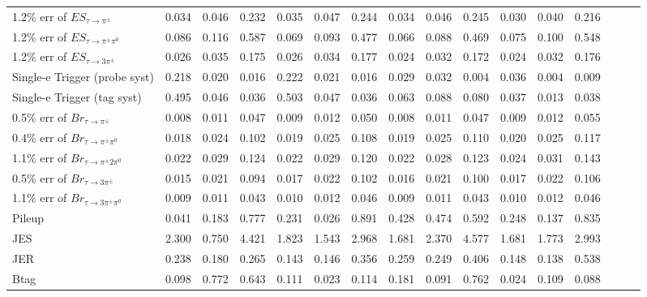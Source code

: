 \begin{tabular}{|l|ccc|ccc|ccc|ccc|ccc|}
      1.2$\%$ err of $ES_{\tau\to\pi^\pm}$       & 0.034 & 0.046 & 0.232 & 0.035 & 0.047 & 0.244 & 0.034 & 0.046 & 0.245 & 0.030 & 0.040 & 0.216 \\ 
      1.2$\%$ err of $ES_{\tau\to\pi^\pm\pi^0}$  & 0.086 & 0.116 & 0.587 & 0.069 & 0.093 & 0.477 & 0.066 & 0.088 & 0.469 & 0.075 & 0.100 & 0.548 \\ 
      1.2$\%$ err of $ES_{\tau\to3\pi^\pm}$      & 0.026 & 0.035 & 0.175 & 0.026 & 0.034 & 0.177 & 0.024 & 0.032 & 0.172 & 0.024 & 0.032 & 0.176 \\ 
      Single-e Trigger (probe syst)              & 0.218 & 0.020 & 0.016 & 0.222 & 0.021 & 0.016 & 0.029 & 0.032 & 0.004 & 0.036 & 0.004 & 0.009 \\ 
      Single-e Trigger (tag syst)                & 0.495 & 0.046 & 0.036 & 0.503 & 0.047 & 0.036 & 0.063 & 0.088 & 0.080 & 0.037 & 0.013 & 0.038 \\ 
      0.5$\%$ err of $Br_{\tau\to\pi^\pm}$       & 0.008 & 0.011 & 0.047 & 0.009 & 0.012 & 0.050 & 0.008 & 0.011 & 0.047 & 0.009 & 0.012 & 0.055 \\ 
      0.4$\%$ err of $Br_{\tau\to\pi^\pm\pi^0}$  & 0.018 & 0.024 & 0.102 & 0.019 & 0.025 & 0.108 & 0.019 & 0.025 & 0.110 & 0.020 & 0.025 & 0.117 \\ 
      1.1$\%$ err of $Br_{\tau\to\pi^\pm2\pi^0}$ & 0.022 & 0.029 & 0.124 & 0.022 & 0.029 & 0.120 & 0.022 & 0.028 & 0.123 & 0.024 & 0.031 & 0.143 \\ 
      0.5$\%$ err of $Br_{\tau\to3\pi^\pm}$      & 0.015 & 0.021 & 0.094 & 0.017 & 0.022 & 0.102 & 0.016 & 0.021 & 0.100 & 0.017 & 0.022 & 0.106 \\ 
      1.1$\%$ err of $Br_{\tau\to3\pi^\pm\pi^0}$ & 0.009 & 0.011 & 0.043 & 0.010 & 0.012 & 0.046 & 0.009 & 0.011 & 0.043 & 0.010 & 0.012 & 0.046 \\ 
      Pileup                                     & 0.041 & 0.183 & 0.777 & 0.231 & 0.026 & 0.891 & 0.428 & 0.474 & 0.592 & 0.248 & 0.137 & 0.835 \\ 
      JES                                        & 2.300 & 0.750 & 4.421 & 1.823 & 1.543 & 2.968 & 1.681 & 2.370 & 4.577 & 1.681 & 1.773 & 2.993 \\ 
      JER                                        & 0.238 & 0.180 & 0.265 & 0.143 & 0.146 & 0.356 & 0.259 & 0.249 & 0.406 & 0.148 & 0.138 & 0.538 \\ 
      Btag                                       & 0.098 & 0.772 & 0.643 & 0.111 & 0.023 & 0.114 & 0.181 & 0.091 & 0.762 & 0.024 & 0.109 & 0.088 \\ 

\end{tabular}
